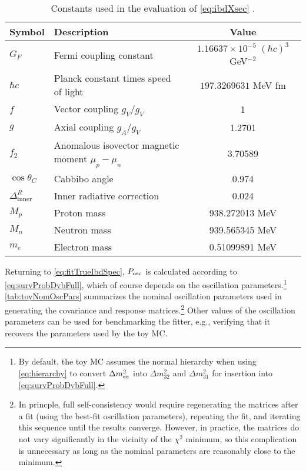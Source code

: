 \documentclass[../thesis.tex]{subfiles}
\begin{document}
\begin{table}[ht]
  \begin{tabular}{llc}
    \toprule
    Symbol & Description & Value \\
    \midrule
    $G_F$ & Fermi coupling constant & $1.16637 \times 10^{-5}\; (\hbar c)^3$ GeV$^{-2}$ \\
    $\hbar c$ & Planck constant times speed of light & $197.3269631$ MeV fm \\
    $f$ & Vector coupling $g_V/g_V$ & 1 \\
    $g$ & Axial coupling $g_A/g_V$ & 1.2701 \\
    $f_2$ & Anomalous isovector magnetic moment $\mu_p - \mu_n$ & 3.70589 \\
    $\cos \theta_C$ & Cabbibo angle & 0.974 \\
    $\Delta^R_{\mathrm{inner}}$ & Inner radiative correction \cite{doi:10.1063/1.59543} & 0.024 \\
    $M_p$ & Proton mass & 938.272013 MeV \\
    $M_n$ & Neutron mass & 939.565345 MeV \\
    $m_e$ & Electron mass & 0.51099891 MeV \\
    \bottomrule
  \end{tabular}
  \caption{Constants used in the evaluation of \autoref{eq:ibdXsec} \cite{pdg2011}.}
  \label{tab:xsecConstants}
\end{table}

Returning to \autoref{eq:fitTrueIbdSpec}, $P_\mathrm{osc}$ is calculated according to \autoref{eq:survProbDybFull}, which of course depends on the oscillation parameters.\footnote{By default, the toy MC assumes the normal hierarchy when using \autoref{eq:hierarchy} to convert $\Delta m^2_{ee}$ into $\Delta m^2_{32}$ and $\Delta m^2_{31}$ for insertion into \autoref{eq:survProbDybFull}.} \autoref{tab:toyNomOscPars} summarizes the nominal oscillation parameters used in generating the covariance and response matrices.\footnote{In princple, full self-consistency would require regenerating the matrices after a fit (using the best-fit oscillation parameters), repeating the fit, and iterating this sequence until the results converge. However, in practice, the matrices do not vary significantly in the vicinity of the $\chi^2$ minimum, so this complication is unnecessary as long as the nominal parameters are reasonably close to the minimum.%
}
Other values of the oscillation parameters can be used for benchmarking the fitter, e.g., verifying that it recovers the parameters used by the toy MC.
\end{document}
